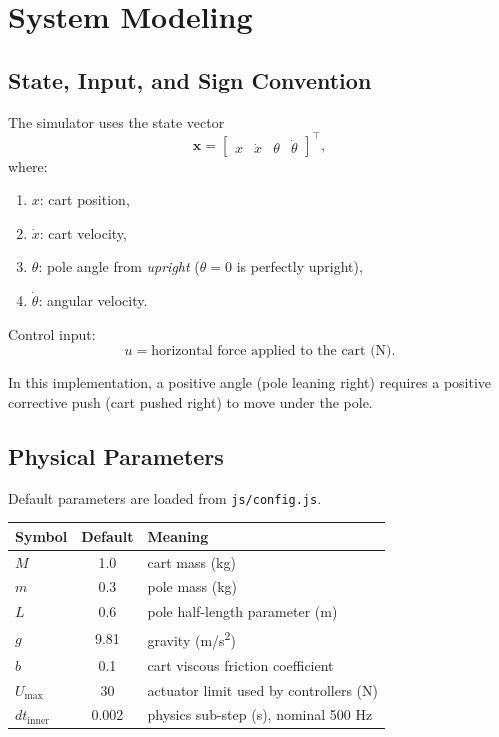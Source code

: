 \documentclass[11pt,a4paper]{article}
\newcommand{\state}{\mathbf{x}}
\begin{document}
\section{System Modeling}
\subsection{State, Input, and Sign Convention}
The simulator uses the state vector
\begin{equation}
\state = \begin{bmatrix}x & \dot{x} & \theta & \dot{\theta}\end{bmatrix}^\top,
\end{equation}
where:
\begin{enumerate}[label=\arabic*.]
  \item $x$: cart position,
  \item $\dot{x}$: cart velocity,
  \item $\theta$: pole angle from \emph{upright} ($\theta=0$ is perfectly upright),
  \item $\dot{\theta}$: angular velocity.
\end{enumerate}

Control input:
\begin{equation}
u = \text{horizontal force applied to the cart (N)}.
\end{equation}

In this implementation, a positive angle (pole leaning right) requires a positive corrective push (cart pushed right) to move under the pole.

\subsection{Physical Parameters}
Default parameters are loaded from \texttt{js/config.js}.

\begin{center}
\begin{tabular}{>{\ttfamily}l c l}
\toprule
Symbol & Default & Meaning \\
\midrule
$M$ & 1.0 & cart mass (kg) \\
$m$ & 0.3 & pole mass (kg) \\
$L$ & 0.6 & pole half-length parameter (m) \\
$g$ & 9.81 & gravity (m/s\textsuperscript{2}) \\
$b$ & 0.1 & cart viscous friction coefficient \\
$U_{\max}$ & 30 & actuator limit used by controllers (N) \\
$dt_{\text{inner}}$ & 0.002 & physics sub-step (s), nominal 500 Hz \\
\bottomrule
\end{tabular}
\end{center}
\end{document}
